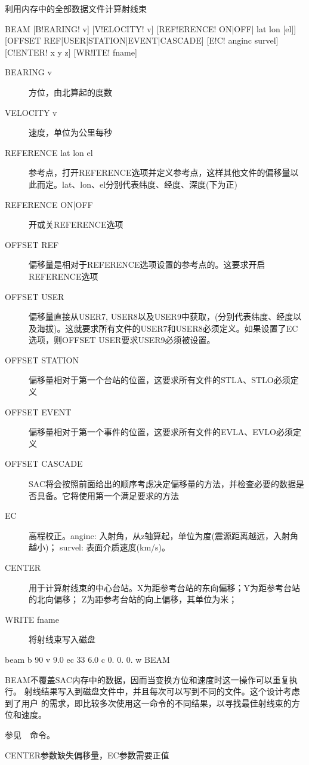 \label{cmd:beam}

利用内存中的全部数据文件计算射线束

\begin{SACSTX}
BEAM [B!EARING! v] [V!ELOCITY! v] [REF!ERENCE! ON|OFF| lat lon [el]]
    [OFFSET REF|USER|STATION|EVENT|CASCADE] [E!C! anginc survel]
    [C!ENTER! x y z] [WR!ITE! fname]
\end{SACSTX}

\begin{description}
\item [BEARING v] 方位，由北算起的度数
\item [VELOCITY v] 速度，单位为公里每秒
\item [REFERENCE lat lon el] 参考点，打开REFERENCE选项并定义参考点，这样其他文件的偏移量以此而定。lat、lon、el分别代表纬度、经度、深度(下为正)
\item [REFERENCE ON|OFF] 开或关REFERENCE选项
\item [OFFSET REF] 偏移量是相对于REFERENCE选项设置的参考点的。这要求开启REFERENCE选项
\item [OFFSET USER] 偏移量直接从USER7, USER8以及USER9中获取，(分别代表纬度、经度以及海拔)。这就要求所有文件的USER7和USER8必须定义。如果设置了EC选项，则OFFSET USER要求USER9必须被设置。
\item [OFFSET STATION] 偏移量相对于第一个台站的位置，这要求所有文件的STLA、STLO必须定义
\item [OFFSET EVENT] 偏移量相对于第一个事件的位置，这要求所有文件的EVLA、EVLO必须定义
\item [OFFSET CASCADE] SAC将会按照前面给出的顺序考虑决定偏移量的方法，并检查必要的数据是否具备。它将使用第一个满足要求的方法
\item [EC] 高程校正。anginc: 入射角，从z轴算起，单位为度(震源距离越远，入射角越小)；
    survel: 表面介质速度(km/s)。
\item [CENTER] 用于计算射线束的中心台站。X为距参考台站的东向偏移；Y为距参考台站的北向偏移；
	Z为距参考台站的向上偏移，其单位为米；
\item [WRITE fname] 将射线束写入磁盘
\end{description}

\begin{SACDFT}
beam  b 90  v 9.0 ec 33  6.0 c  0. 0. 0. w BEAM
\end{SACDFT}

BEAM不覆盖SAC内存中的数据，因而当变换方位和速度时这一操作可以重复执行。
射线结果写入到磁盘文件中，并且每次可以写到不同的文件。这个设计考虑到了用户
的需求，即比较多次使用这一命令的不同结果，以寻找最佳射线束的方位和速度。

参见~~命令。

CENTER参数缺失偏移量，EC参数需要正值

